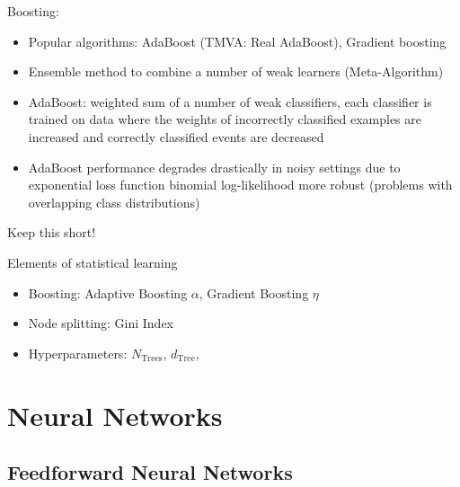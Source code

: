 Boosting:
\begin{itemize}
\item Popular algorithms: AdaBoost (TMVA: Real AdaBoost), Gradient boosting
\item Ensemble method to combine a number of weak learners (Meta-Algorithm)
\item AdaBoost: weighted sum of a number of weak classifiers, each classifier is
  trained on data where the weights of incorrectly classified examples are
  increased and correctly classified events are decreased
\item AdaBoost performance degrades drastically in noisy settings due to
  exponential loss function \cite{esl} binomial log-likelihood more robust
  (problems with overlapping class distributions)
\end{itemize}

Keep this short!

Elements of statistical learning \cite{esl}

\begin{itemize}
\item Boosting: Adaptive Boosting $\alpha$, Gradient Boosting $\eta$
\item Node splitting: Gini Index
\item Hyperparameters: $N_\mathrm{Trees}$, $d_\mathrm{Tree}$,
\end{itemize}

\section{Neural Networks}
\label{sec:nn}


\subsection{Feedforward Neural Networks}
\label{sec:nn_feedforward}

